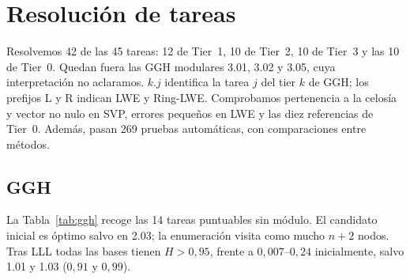 \section{Resolución de tareas}
Resolvemos 42 de las 45 tareas: 12 de Tier~1, 10 de Tier~2, 10 de Tier~3 y las 10 de Tier~0.
Quedan fuera las GGH modulares 3.01, 3.02 y 3.05, cuya interpretación no aclaramos.
$k.j$ identifica la tarea $j$ del tier $k$ de GGH; los prefijos L y R indican LWE y Ring-LWE.
Comprobamos pertenencia a la celosía y vector no nulo en SVP, errores pequeños en LWE y las diez
referencias de Tier~0. Además, pasan 269 pruebas automáticas, con comparaciones entre métodos.

\subsection{GGH}
La Tabla~\ref{tab:ggh} recoge las 14 tareas puntuables sin módulo. El candidato inicial es óptimo
salvo en 2.03; la enumeración visita como mucho $n+2$ nodos. Tras LLL todas las bases tienen
$H>0{,}95$, frente a $0{,}007$--$0{,}24$ inicialmente, salvo 1.01 y 1.03 ($0{,}91$ y $0{,}99$).

\begin{table}[htb]
\centering

\caption{GGH: $d^2=\|v\|^2$ en SVP y $\|v-t\|^2$ en CVP. Tiempo de LLL y enumeración:
mediana de \Repeticiones{} repeticiones. Dimensión: número de coordenadas. En SVP también vale $-v$.}
\label{tab:ggh}
\end{table}
